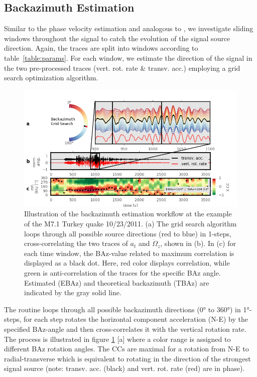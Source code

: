 \documentclass[12pt,reqno,letter]{article} %
\begin{document}
\subsection{Backazimuth Estimation}
\label{subsec:be}
Similar to the phase velocity estimation and analogous to \cite{Igel2007}, we investigate sliding windows throughout the signal to catch the evolution of the signal source direction.  Again, the traces are split into windows according to table~\ref{table:params}.
For each window, we estimate the direction of the signal in the two pre-processed traces (vert. rot. rate \& transv. acc.) employing a grid search optimization algorithm. 
%
\begin{figure}[!htp]
\centering
\includegraphics[width=\textwidth]{pp_Baz_paperready.png}
\caption{Illustration of the backazimuth estimation workflow at the example of the M7.1 Turkey quake 10/23/2011. (a) The grid search algorithm loops through all possible source directions (red to blue) in 1\textdegree -steps, cross-correlating the two traces of $a_t$ and $\dot{\Omega}_z$, shown in (b). In (c) for each time window, the BAz-value related to maximum correlation is displayed as a black dot. Here, red color displays correlation, while green is anti-correlation of the traces for the specific BAz angle. Estimated (EBAz) and theoretical backazimuth (TBAz) are indicated by the gray solid line.}
\label{fig:baz}
\end{figure}
%
The routine loops through all possible backazimuth directions (0° to 360°) in 1°- steps, for each step rotates the horizontal component acceleration (N-E) by the specified BAz-angle and then cross-correlates it with the vertical rotation rate. The process is illustrated in figure \ref{fig:baz} [a] where a color range is assigned to different BAz rotation angles.  The CCs are maximal for a rotation from N-E to radial-transverse which is equivalent to rotating in the direction of the strongest signal source (note: transv. acc. (black) and vert. rot. rate (red) are in phase).\\ 
\end{document}
